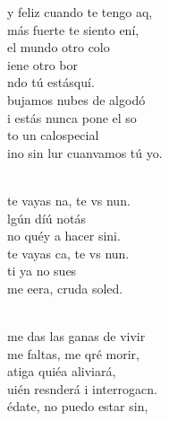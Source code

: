 \begin{cancion}%
	y feliz cuando te tengo aq,\\
	 más fuerte te siento ení,\\
	el mundo  otro colo\\
	iene otro bor \\
	ndo tú estásquí.\\
	bujamos nubes de algodó\\
	i estás nunca pone el so\\
	to un calospecial \\
	ino sin lur cuanvamos tú yo.\\\jump\\
	\begin{chorus}%
	 te vayas na, te vs nun.\\
	lgún díú notás\\
	no  quéy a hacer sini. \\
	 te vayas ca, te vs nun.\\
	ti ya no  sues\\
	me eera, cruda soled.\\
	\end{chorus}%
	\jump\\
	 me das las ganas de vivir\\
	me faltas, me qré morir,\\
	atiga quiéa aliviará,\\
	uién resnderá i interrogacn. \\
	édate, no puedo estar sin,\\

\end{cancion}
